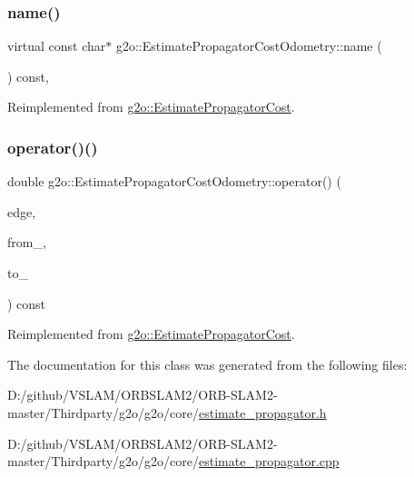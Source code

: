 \subsubsection{\texorpdfstring{name()}{name()}}
{\footnotesize\ttfamily virtual const char$\ast$ g2o\+::\+Estimate\+Propagator\+Cost\+Odometry\+::name (\begin{DoxyParamCaption}{ }\end{DoxyParamCaption}) const\hspace{0.3cm}{\ttfamily [inline]}, {\ttfamily [virtual]}}



Reimplemented from \mbox{\hyperlink{classg2o_1_1_estimate_propagator_cost_a49846dd23f5d49df6e1fc5c2ff854fca}{g2o\+::\+Estimate\+Propagator\+Cost}}.

\mbox{\label{classg2o_1_1_estimate_propagator_cost_odometry_a3da1f1d67f717d0dbc0077db1c571146}} 
\subsubsection{\texorpdfstring{operator()()}{operator()()}}
{\footnotesize\ttfamily double g2o\+::\+Estimate\+Propagator\+Cost\+Odometry\+::operator() (\begin{DoxyParamCaption}\item[{\mbox{\hyperlink{classg2o_1_1_optimizable_graph_1_1_edge}{Optimizable\+Graph\+::\+Edge}} $\ast$}]{edge,  }\item[{const \mbox{\hyperlink{classg2o_1_1_hyper_graph_a703938cdb4bb636860eed55a2489d70c}{Optimizable\+Graph\+::\+Vertex\+Set}} \&}]{from\+\_\+,  }\item[{\mbox{\hyperlink{classg2o_1_1_optimizable_graph_1_1_vertex}{Optimizable\+Graph\+::\+Vertex}} $\ast$}]{to\+\_\+ }\end{DoxyParamCaption}) const\hspace{0.3cm}{\ttfamily [virtual]}}



Reimplemented from \mbox{\hyperlink{classg2o_1_1_estimate_propagator_cost_a1234b3b82be9b8448cc62b18625adfa6}{g2o\+::\+Estimate\+Propagator\+Cost}}.



The documentation for this class was generated from the following files\+:\begin{DoxyCompactItemize}
\item 
D\+:/github/\+V\+S\+L\+A\+M/\+O\+R\+B\+S\+L\+A\+M2/\+O\+R\+B-\/\+S\+L\+A\+M2-\/master/\+Thirdparty/g2o/g2o/core/\mbox{\hyperlink{estimate__propagator_8h}{estimate\+\_\+propagator.\+h}}\item 
D\+:/github/\+V\+S\+L\+A\+M/\+O\+R\+B\+S\+L\+A\+M2/\+O\+R\+B-\/\+S\+L\+A\+M2-\/master/\+Thirdparty/g2o/g2o/core/\mbox{\hyperlink{estimate__propagator_8cpp}{estimate\+\_\+propagator.\+cpp}}\end{DoxyCompactItemize}
